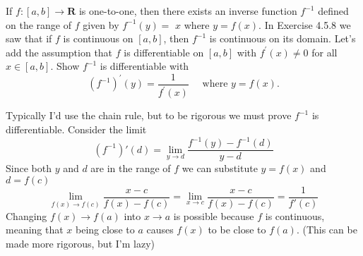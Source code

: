 \begin{exercise}
  If $f:[a, b] \rightarrow \mathbf{R}$ is one-to-one, then there exists an inverse function $f^{-1}$ defined on the range of $f$ given by $f^{-1}(y)=$ $x$ where $y=f(x)$. In Exercise 4.5.8 we saw that if $f$ is continuous on $[a, b]$, then $f^{-1}$ is continuous on its domain. Let's add the assumption that $f$ is differentiable on $[a, b]$ with $f^{\prime}(x) \neq 0$ for all $x \in[a, b]$. Show $f^{-1}$ is differentiable with
  $$
  \left(f^{-1}\right)^{\prime}(y)=\frac{1}{f^{\prime}(x)} \quad \text { where } y=f(x) .
  $$
\end{exercise}
\begin{solution}
  Typically I'd use the chain rule, but to be rigorous we must prove $f^{-1}$ is differentiable.
  Consider the limit
  $$
  \left(f^{-1}\right)'(d) = \lim_{y \to d} \frac{f^{-1}(y) - f^{-1}(d)}{y-d}
  $$
  Since both $y$ and $d$ are in the range of $f$ we can substitute $y=f(x)$ and $d=f(c)$
  $$
  \lim_{f(x) \to f(c)} \frac{x - c}{f(x) - f(c)} = \lim_{x \to c} \frac{x - c}{f(x) - f(c)} = \frac{1}{f'(c)}
  $$
  Changing $f(x) \to f(a)$ into $x \to a$ is possible because $f$ is continuous, meaning that $x$ being close to $a$ causes $f(x)$ to be close to $f(a)$. (This can be made more rigorous, but I'm lazy)
\end{solution}
